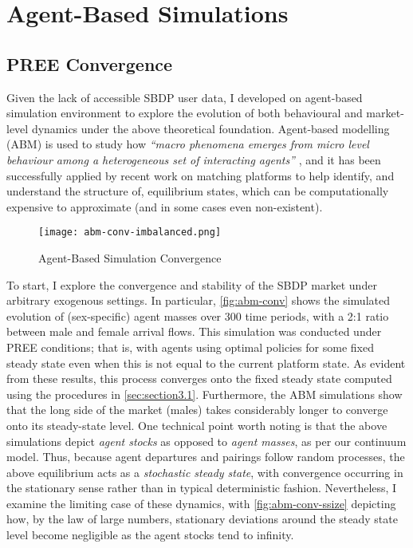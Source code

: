 \section{Agent-Based Simulations}
\label{sec:section4}  
\subsection{PREE Convergence}
Given the lack of accessible SBDP user data, I developed on agent-based simulation environment to explore the evolution of both behavioural and market-level dynamics under the above theoretical foundation. 
Agent-based modelling (ABM) is used to study how \textit{``macro phenomena emerges from micro level behaviour among a heterogeneous set of interacting agents''} \citep{janssen2005agent}, and it has been successfully applied by recent work on matching platforms \citep{immorlica2021designing} to help identify, and understand the structure of, equilibrium states, which can be computationally expensive to approximate (and in some cases even non-existent).

\begin{figure}[ht]
    \centering
    \caption{Agent-Based Simulation Convergence}
    \texttt{[image: abm-conv-imbalanced.png]}
    \label{fig:abm-conv} 
\end{figure}

To start, I explore the convergence and stability of the SBDP market under arbitrary exogenous settings. In particular, \autoref{fig:abm-conv} shows the simulated evolution of (sex-specific) agent masses over 300 time periods, with a 2:1 ratio between male and female arrival flows. This simulation was conducted under PREE conditions; that is, with agents using optimal policies for some fixed steady state even when this is not equal to the current platform state.  
As evident from these results, this process converges onto the fixed steady state computed using the procedures in \autoref{sec:section3.1}. Furthermore, the ABM simulations show that the long side of the market (males) takes considerably longer to converge onto its steady-state level. One technical point worth noting is that the above simulations depict \textit{agent stocks} as opposed to \textit{agent masses}, as per our continuum model. Thus, because agent departures and pairings follow random processes, the above equilibrium acts as a \textit{stochastic steady state}, with convergence occurring in the stationary sense rather than in typical deterministic fashion. Nevertheless, I examine the limiting case of these dynamics, with \autoref{fig:abm-conv-ssize} depicting how, by the law of large numbers, stationary deviations around the steady state level become negligible as the agent stocks tend to infinity. 

